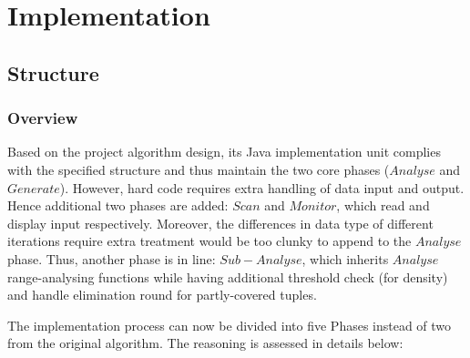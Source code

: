 \chapter{Implementation}

\section{Structure}

\subsection{Overview}

Based on the project algorithm design, its Java implementation unit complies with the specified structure and thus maintain the two core phases ($Analyse$ and $Generate$). However, hard code requires extra handling of data input and output. Hence additional two phases are added: $Scan$ and $Monitor$, which read and display input respectively. Moreover, the differences in data type of different iterations require extra treatment would be too clunky to append to the $Analyse$ phase. Thus, another phase is in line: $Sub-Analyse$, which inherits $Analyse$ range-analysing functions while having additional threshold check (for density) and handle elimination round for partly-covered tuples.  

The implementation process can now be divided into five Phases instead of two from the original algorithm. The reasoning is assessed in details below:



